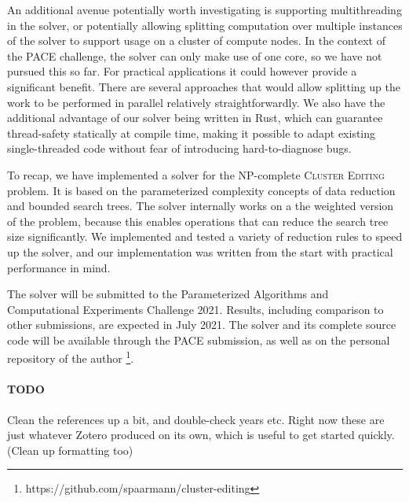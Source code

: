 \documentclass[12pt,oneside,english,parskip=full,headings=small]{scrbook}
\newcommand{\todo}[1]{\paragraph{TODO} #1}
\theoremstyle{definition}
\begin{document}
An additional avenue potentially worth investigating is supporting multithreading in the solver, or
potentially allowing splitting computation over multiple instances of the solver to support usage on
a cluster of compute nodes. In the context of the PACE challenge, the solver can only make use of
one core, so we have not pursued this so far. For practical applications it could however provide a
significant benefit. There are several approaches that would allow splitting up the work to be
performed in parallel relatively straightforwardly. We also have the additional advantage of our
solver being written in Rust, which can guarantee thread-safety statically at compile time, making
it possible to adapt existing single-threaded code without fear of introducing hard-to-diagnose
bugs.

To recap, we have implemented a solver for the NP-complete \textsc{Cluster Editing} problem. It is
based on the parameterized complexity concepts of data reduction and bounded search trees. The
solver internally works on a the weighted version of the problem, because this enables operations
that can reduce the search tree size significantly. We implemented and tested a variety of reduction
rules to speed up the solver, and our implementation was written from the start with practical
performance in mind.

The solver will be submitted to the Parameterized Algorithms and Computational Experiments Challenge
2021. Results, including comparison to other submissions, are expected in July 2021. The solver and
its complete source code will be available through the PACE submission, as well as on the personal
repository of the author \footnote{https://github.com/spaarmann/cluster-editing}.

\todo Clean the references up a bit, and double-check years etc. Right now these are just whatever
Zotero produced on its own, which is useful to get started quickly. (Clean up formatting too)
\end{document}
